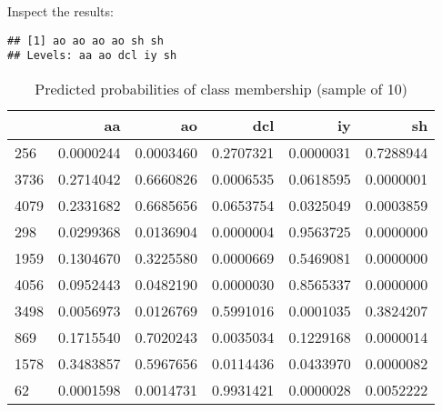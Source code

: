 \documentclass[
]{article}
\newenvironment{Shaded}{\begin{snugshade}}{\end{snugshade}}
\newcommand{\AttributeTok}[1]{\textcolor[rgb]{0.77,0.63,0.00}{#1}}
\newcommand{\CommentTok}[1]{\textcolor[rgb]{0.56,0.35,0.01}{\textit{#1}}}
\newcommand{\ConstantTok}[1]{\textcolor[rgb]{0.00,0.00,0.00}{#1}}
\newcommand{\DecValTok}[1]{\textcolor[rgb]{0.00,0.00,0.81}{#1}}
\newcommand{\FunctionTok}[1]{\textcolor[rgb]{0.00,0.00,0.00}{#1}}
\newcommand{\NormalTok}[1]{#1}
\newcommand{\SpecialCharTok}[1]{\textcolor[rgb]{0.00,0.00,0.00}{#1}}
\newcommand{\StringTok}[1]{\textcolor[rgb]{0.31,0.60,0.02}{#1}}
\begin{document}
Inspect the results:

\begin{Shaded}
\end{Shaded}

\begin{verbatim}
## [1] ao ao ao ao sh sh
## Levels: aa ao dcl iy sh
\end{verbatim}

\begin{Shaded}
\end{Shaded}

\begin{table}

\caption{\label{tab:unnamed-chunk-32}Predicted probabilities of class membership (sample of 10)}
\centering
\begin{tabular}[t]{l|r|r|r|r|r}
\hline
  & aa & ao & dcl & iy & sh\\
\hline
256 & 0.0000244 & 0.0003460 & 0.2707321 & 0.0000031 & 0.7288944\\
\hline
3736 & 0.2714042 & 0.6660826 & 0.0006535 & 0.0618595 & 0.0000001\\
\hline
4079 & 0.2331682 & 0.6685656 & 0.0653754 & 0.0325049 & 0.0003859\\
\hline
298 & 0.0299368 & 0.0136904 & 0.0000004 & 0.9563725 & 0.0000000\\
\hline
1959 & 0.1304670 & 0.3225580 & 0.0000669 & 0.5469081 & 0.0000000\\
\hline
4056 & 0.0952443 & 0.0482190 & 0.0000030 & 0.8565337 & 0.0000000\\
\hline
3498 & 0.0056973 & 0.0126769 & 0.5991016 & 0.0001035 & 0.3824207\\
\hline
869 & 0.1715540 & 0.7020243 & 0.0035034 & 0.1229168 & 0.0000014\\
\hline
1578 & 0.3483857 & 0.5967656 & 0.0114436 & 0.0433970 & 0.0000082\\
\hline
62 & 0.0001598 & 0.0014731 & 0.9931421 & 0.0000028 & 0.0052222\\
\hline
\end{tabular}
\end{table}
\end{document}
